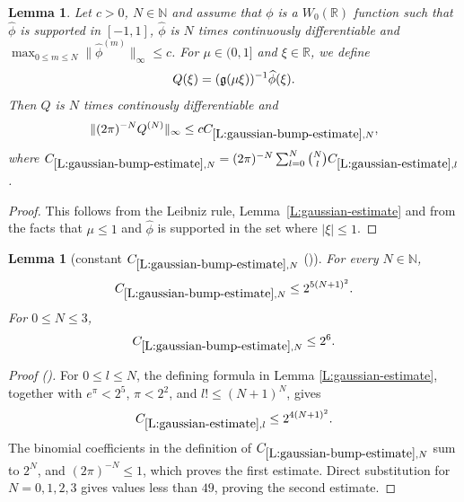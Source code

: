 \documentclass[12pt,reqno]{amsart}
\newcommand{\auto}{{({\tiny\faCar})}}
\theoremstyle{plain}
\newtheorem{lemma}[theorem]{Lemma}
\numberwithin{equation}{section}
\theoremstyle{remark}
\newcommand{\using}[1]{}
\newcommand{\R}{{\mathbb R}}
\newcommand{\N}{{\mathbb N}}
\newcommand{\jr}[1]{{\color{orange}{[J: #1]}}}
\begin{document}
\begin{lemma}\label{L:gaussian-bump-estimate}\using{L:gaussian-estimate}
Let $c>0$, $N \in \mathbb N$ and assume that $\phi$ is a $W_0(\R)$ function such that $\widehat{\phi}$ is supported in $[-1,1]$, $\widehat{\phi}$ is $N$ times continuously differentiable and $\max_{0\leq m \leq N} \|\widehat{\phi}^{(m)}\|_{\infty} \leq c$.
For $\mu \in (0,1]$ and $\xi \in \R$, we define
\begin{equation}\label{auto:Gaussian-bump-quotient}
Q(\xi)=(\mathfrak{g}(\mu\xi))^{-1}\widehat{\phi}(\xi).
\end{equation}
Then $Q$ is $N$ times continously differentiable and
\begin{equation}\label{E:estimate-Q}
\|(2\pi)^{-N}Q^{(N)}\|_{\infty} \leq c C_{\ref{L:gaussian-bump-estimate},N},
\end{equation}
where $C_{\ref{L:gaussian-bump-estimate},N}= (2\pi)^{-N}\sum_{l=0}^N \binom{N}{l} C_{\ref{L:gaussian-estimate},l}$.
\end{lemma}

\begin{proof}

This follows from the Leibniz rule, Lemma~\ref{L:gaussian-estimate} and from the facts that $\mu \leq 1$ and $\widehat{\phi}$ is supported in the set where $|\xi|\leq 1$.
\end{proof}

\begin{lemma}[constant $C_{\ref{L:gaussian-bump-estimate},N}$ \auto]\label{constant gaussian bump estimate}\using{L:gaussian-estimate}\using{L:gaussian-bump-estimate}
For every $N\in\N$,
\begin{equation}\label{constant gaussian bump estimate bound}
C_{\ref{L:gaussian-bump-estimate},N}\le2^{5(N+1)^2}.
\end{equation}
For $0\le N\le3$,
\begin{equation}\label{auto:constant-gaussian-bump-estimate-small}
C_{\ref{L:gaussian-bump-estimate},N}\le2^6.
\end{equation}
\end{lemma}
\begin{proof}[Proof \auto]
For $0\le l\le N$, the defining formula in Lemma \ref{L:gaussian-estimate}, together with $e^\pi<2^5$, $\pi<2^2$, and $l!\le (N+1)^N$, gives
\[
C_{\ref{L:gaussian-estimate},l}\le2^{4(N+1)^2}.
\]
The binomial coefficients in the definition of $C_{\ref{L:gaussian-bump-estimate},N}$ sum to $2^N$, and $(2\pi)^{-N}\le1$, which proves the first estimate. Direct substitution for $N=0,1,2,3$ gives values less than $49$, proving the second estimate.\jr{GPT: Another example of constant waste. When aboslute constants are $<1000$ you don't have to use a power of $2$, instead use the smaller number}
\end{proof}
\end{document}
